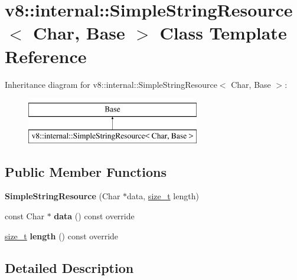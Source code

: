\hypertarget{classv8_1_1internal_1_1SimpleStringResource}{}\section{v8\+:\+:internal\+:\+:Simple\+String\+Resource$<$ Char, Base $>$ Class Template Reference}
\label{classv8_1_1internal_1_1SimpleStringResource}
Inheritance diagram for v8\+:\+:internal\+:\+:Simple\+String\+Resource$<$ Char, Base $>$\+:\begin{figure}[H]
\begin{center}
\leavevmode
\includegraphics[height=2.000000cm]{classv8_1_1internal_1_1SimpleStringResource}
\end{center}
\end{figure}
\subsection*{Public Member Functions}
\begin{DoxyCompactItemize}
\item 
\mbox{\label{classv8_1_1internal_1_1SimpleStringResource_a98bb052293e7c70772380bb74fcb13b6}} 
{\bfseries Simple\+String\+Resource} (Char $\ast$data, \mbox{\hyperlink{classsize__t}{size\+\_\+t}} length)
\item 
\mbox{\label{classv8_1_1internal_1_1SimpleStringResource_ae1dd43f7c27f0111afa4b3a4f352b3ba}} 
const Char $\ast$ {\bfseries data} () const override
\item 
\mbox{\label{classv8_1_1internal_1_1SimpleStringResource_a1e262b03796564d7e380656d495169bb}} 
\mbox{\hyperlink{classsize__t}{size\+\_\+t}} {\bfseries length} () const override
\end{DoxyCompactItemize}


\subsection{Detailed Description}
